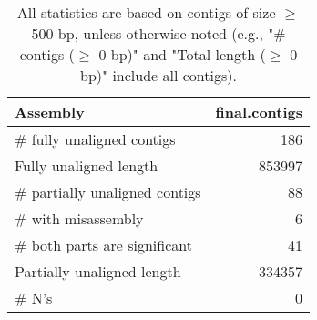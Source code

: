 \documentclass[12pt,a4paper]{article}
\begin{document}
\begin{table}[ht]
\begin{center}
\caption{All statistics are based on contigs of size $\geq$ 500 bp, unless otherwise noted (e.g., "\# contigs ($\geq$ 0 bp)" and "Total length ($\geq$ 0 bp)" include all contigs).}
\begin{tabular}{|l*{1}{|r}|}
\hline
Assembly & final.contigs \\ \hline
\# fully unaligned contigs & 186 \\ \hline
Fully unaligned length & 853997 \\ \hline
\# partially unaligned contigs & 88 \\ \hline
\hspace{5mm}\# with misassembly & 6 \\ \hline
\hspace{5mm}\# both parts are significant & 41 \\ \hline
Partially unaligned length & 334357 \\ \hline
\# N's & 0 \\ \hline
\end{tabular}
\end{center}
\end{table}
\end{document}
